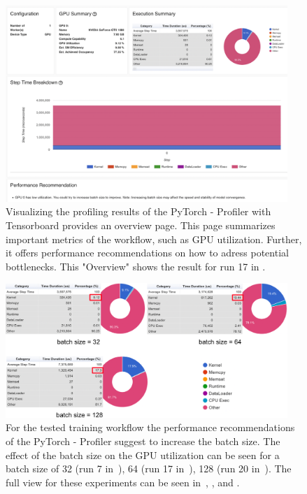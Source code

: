 \documentclass[12pt, a4paper, hidelinks]{article}
\begin{document}
\begin{figure}[H]
\centering
\includegraphics[width=0.95\textwidth]{./assets/scap_gtx1080_profiler-torch_14650076}
\vspace{-0.5em}
\caption[PyTorch - Profiler: Overview]{Visualizing the profiling results of the PyTorch - Profiler with Tensorboard provides an overview page. This page summarizes important metrics of the workflow, such as \ac{GPU} utilization. Further, it offers performance recommendations on how to adress potential bottlenecks. This "Overview" shows the result for run 17 in .}
\label{fig:scap_gtx1080_profiler-torch_14650076}
\end{figure}

\begin{figure}[H]
\centering
\includegraphics[width=0.95\textwidth]{./assets/scap_gtx1080_profiler-torch_comparison-batch-size}
\vspace{-0.5em}
\caption[PyTorch - Profiler: Performance Recommendation]{For the tested training workflow the performance recommendations of the PyTorch - Profiler suggest to increase the batch size. The effect of the batch size on the \ac{GPU} utilization can be seen for a batch size of 32 (run 7 in~), 64 (run 17 in~), 128 (run 20 in~). The full view for these experiments can be seen in~, , and .}
\label{fig:scap_gtx1080_profiler-torch_comparison-batch-size}
\end{figure}
\end{document}
